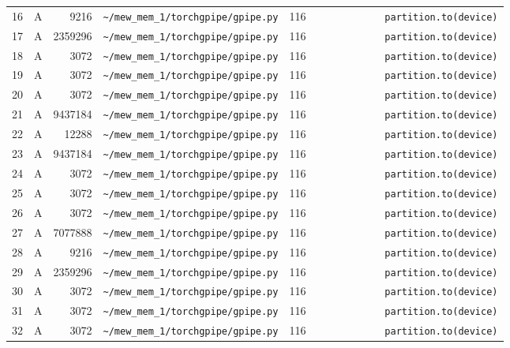 \documentclass{article}
\begin{document}
\begin{longtable}{r l r p{6.5cm} r p{7.0cm}}
16 & A & 9216 & \lstinline|~/mew_mem_1/torchgpipe/gpipe.py| & 116 & \lstinline|            partition.to(device)| \\
17 & A & 2359296 & \lstinline|~/mew_mem_1/torchgpipe/gpipe.py| & 116 & \lstinline|            partition.to(device)| \\
18 & A & 3072 & \lstinline|~/mew_mem_1/torchgpipe/gpipe.py| & 116 & \lstinline|            partition.to(device)| \\
19 & A & 3072 & \lstinline|~/mew_mem_1/torchgpipe/gpipe.py| & 116 & \lstinline|            partition.to(device)| \\
20 & A & 3072 & \lstinline|~/mew_mem_1/torchgpipe/gpipe.py| & 116 & \lstinline|            partition.to(device)| \\
21 & A & 9437184 & \lstinline|~/mew_mem_1/torchgpipe/gpipe.py| & 116 & \lstinline|            partition.to(device)| \\
22 & A & 12288 & \lstinline|~/mew_mem_1/torchgpipe/gpipe.py| & 116 & \lstinline|            partition.to(device)| \\
23 & A & 9437184 & \lstinline|~/mew_mem_1/torchgpipe/gpipe.py| & 116 & \lstinline|            partition.to(device)| \\
24 & A & 3072 & \lstinline|~/mew_mem_1/torchgpipe/gpipe.py| & 116 & \lstinline|            partition.to(device)| \\
25 & A & 3072 & \lstinline|~/mew_mem_1/torchgpipe/gpipe.py| & 116 & \lstinline|            partition.to(device)| \\
26 & A & 3072 & \lstinline|~/mew_mem_1/torchgpipe/gpipe.py| & 116 & \lstinline|            partition.to(device)| \\
27 & A & 7077888 & \lstinline|~/mew_mem_1/torchgpipe/gpipe.py| & 116 & \lstinline|            partition.to(device)| \\
28 & A & 9216 & \lstinline|~/mew_mem_1/torchgpipe/gpipe.py| & 116 & \lstinline|            partition.to(device)| \\
29 & A & 2359296 & \lstinline|~/mew_mem_1/torchgpipe/gpipe.py| & 116 & \lstinline|            partition.to(device)| \\
30 & A & 3072 & \lstinline|~/mew_mem_1/torchgpipe/gpipe.py| & 116 & \lstinline|            partition.to(device)| \\
31 & A & 3072 & \lstinline|~/mew_mem_1/torchgpipe/gpipe.py| & 116 & \lstinline|            partition.to(device)| \\
32 & A & 3072 & \lstinline|~/mew_mem_1/torchgpipe/gpipe.py| & 116 & \lstinline|            partition.to(device)| \\

\end{longtable}
\end{document}
